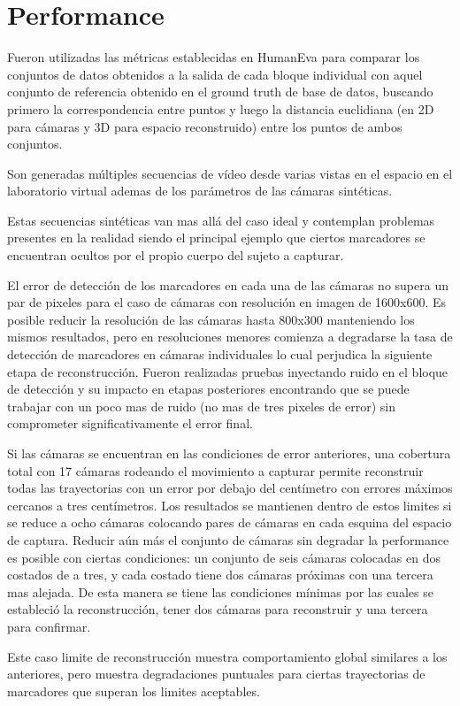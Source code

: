 \section{Performance}

Fueron utilizadas las métricas establecidas en HumanEva \cite{humaneva} para comparar los conjuntos de datos obtenidos a la salida de cada bloque individual con aquel conjunto de referencia obtenido en el ground truth de base de datos, buscando primero la correspondencia entre puntos y luego la distancia euclidiana (en 2D para cámaras y 3D para espacio reconstruido) entre los puntos de ambos conjuntos.


Son generadas múltiples secuencias de vídeo desde varias vistas en el espacio en el laboratorio virtual ademas de los parámetros de las cámaras sintéticas.


Estas secuencias sintéticas van mas allá del caso ideal y contemplan problemas presentes en la realidad siendo el principal ejemplo que ciertos marcadores se encuentran ocultos por el propio cuerpo del sujeto a capturar. 


El error de detección de los marcadores en cada una de las cámaras no supera un par de pixeles para el caso de cámaras con resolución en imagen de 1600x600. Es posible reducir la resolución de las cámaras hasta 800x300 manteniendo los mismos resultados, pero en resoluciones menores comienza a degradarse la tasa de detección de marcadores en cámaras individuales lo cual perjudica la siguiente etapa de reconstrucción. Fueron realizadas pruebas inyectando ruido en el bloque de detección y su impacto en etapas posteriores encontrando que se puede trabajar con un poco mas de ruido (no mas de tres pixeles de error) sin comprometer significativamente el error final.


Si las cámaras se encuentran en las condiciones de error anteriores, una cobertura total con 17 cámaras rodeando el movimiento a capturar permite reconstruir todas las trayectorias con un error por debajo del centímetro con errores máximos cercanos a tres centímetros. Los resultados se mantienen dentro de estos limites si se reduce a ocho cámaras colocando pares de cámaras en cada esquina del espacio de captura. Reducir aún más el conjunto de cámaras sin degradar la performance es posible con ciertas condiciones: un conjunto de seis cámaras colocadas en dos costados de a tres, y cada costado tiene dos cámaras próximas con una tercera mas alejada. De esta manera se tiene las condiciones mínimas por las cuales se estableció la reconstrucción, tener dos cámaras para reconstruir y una tercera para confirmar.


Este caso limite de reconstrucción muestra comportamiento global similares a los anteriores, pero muestra degradaciones puntuales para ciertas trayectorias de marcadores que superan los limites aceptables.


